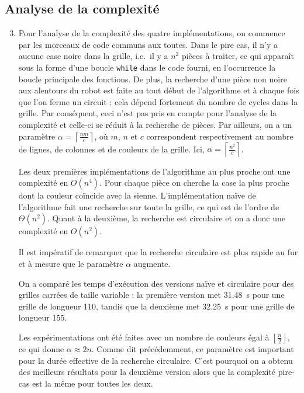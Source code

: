\documentclass[12pt,a4paper]{article}
\begin{document}
\subsection*{Analyse de la complexit\'e}
\begin{enumerate}
\setcounter{enumi}{2}
\item Pour l'analyse de la complexit\'e des quatre impl\'ementations, on 
commence par les morceaux de code communs aux toutes. Dans le pire cas, 
il n'y a aucune case noire dans la grille, i.e.\ il y a $n^2$ pi\`eces \`a 
traiter, ce qui appara\^it sous la forme d'une boucle \texttt{while} dans le 
code fourni, en l'occurrence la boucle principale des fonctions. De 
plus, la recherche d'une pi\`ece non noire aux alentours du robot est faite au 
tout d\'ebut de l'algorithme et \`a chaque fois que l'on ferme un 
circuit : cela d\'epend fortement du nombre de cycles dans la grille. Par 
cons\'equent, ceci n'est pas pris en compte pour l'analyse de la complexit\'e et 
celle-ci se r\'eduit \`a la recherche de pi\`eces. Par ailleurs, on a un 
param\`etre $\alpha = \left \lceil \frac{nm}{c} 
\right \rceil$, o\`u $m$, $n$ et $c$ correspondent respectivement au nombre 
de lignes, de colonnes et de couleurs de la grille. Ici, $\alpha = \left \lceil 
\frac{n^2}{c} \right \rceil$.\par
Les deux premi\`eres impl\'ementations de l'algorithme au plus proche ont une 
complexit\'e en $O(n^4)$. Pour chaque pi\`ece on cherche la case la plus proche 
dont la couleur co\"incide avec la sienne. L'impl\'ementation na\"ive de 
l'algorithme fait une recherche sur toute la grille, ce qui est de l'ordre de 
$\Theta(n^2)$. Quant \`a la deuxi\`eme, la recherche est circulaire et on a donc 
une complexit\'e en $O(n^2)$.

Il est imp\'eratif de remarquer que la recherche circulaire est 
plus rapide au fur et \`a mesure que le param\`etre $\alpha$ augmente. \par
On a compar\'e les temps d'ex\'ecution des versions na\"ive et circulaire pour 
des grilles carr\'ees de taille variable : la premi\`ere version met 
\SI{31,48}{\second} pour une grille de longueur 110, tandis que la deuxi\`eme 
met \SI{32,25}{\second} pour une grille de longueur 155.

Les exp\'erimentations ont \'et\'e faites avec un nombre de couleurs \'egal \`a 
$\left \lfloor \frac{n}{2} \right \rfloor$, ce qui donne $\alpha \approx 2n$. 
Comme dit pr\'ec\'edemment, ce param\`etre est important pour la dur\'ee 
effective de la recherche circulaire. C'est pourquoi on a obtenu des meilleurs 
r\'esultats pour la deuxi\`eme version alors que la complexit\'e pire-cas est 
la m\^eme pour toutes les deux.
\end{enumerate}
\end{document}
